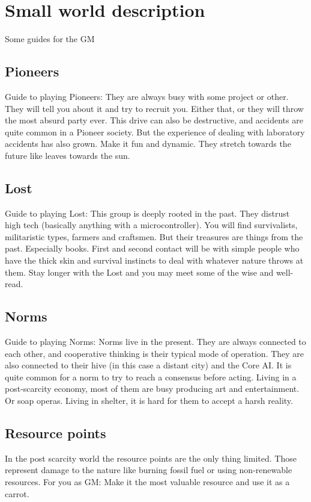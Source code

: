 
\chapter{Small world description}

Some guides for the GM

\section{Pioneers}
\label{sec:Pioneers}
Guide to playing Pioneers: They are always busy with some project or other. They will tell you about it and try to recruit you. Either that, or they will throw the most absurd party ever. This drive can also be destructive, and accidents are quite common in a Pioneer society. But the experience of dealing with laboratory accidents has also grown.
Make it fun and dynamic.
They stretch towards the future like leaves towards the sun.

\section{Lost}
\label{sec:Lost}
Guide to playing Lost: This group is deeply rooted in the past. They distrust high tech (basically anything with a microcontroller). You will find survivalists, militaristic types, farmers and craftsmen. But their treasures are things from the past. Especially books.
First and second contact will be with simple people who have the thick skin and survival instincts to deal with whatever nature throws at them. Stay longer with the Lost and you may meet some of the wise and well-read.


\section{Norms}
\label{sec:Norms}
Guide to playing Norms: Norms live in the present. They are always connected to each other, and cooperative thinking is their typical mode of operation. They are also connected to their hive (in this case a distant city) and the Core AI.
It is quite common for a norm to try to reach a consensus before acting.
Living in a post-scarcity economy, most of them are busy producing art and entertainment. Or soap operas. Living in shelter, it is hard for them to accept a harsh reality.


\section{Resource points}
\label{sec:Resource Points}
In the post scarcity world the resource points are the only thing limited. Those represent damage to the nature like burning fossil fuel or using non-renewable resources. For you as GM: Make it the most valuable resource and use it as a carrot.